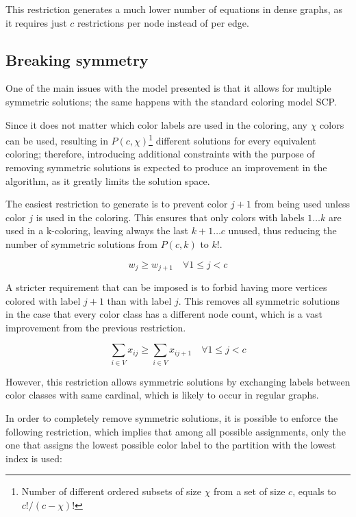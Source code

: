 This restriction generates a much lower number of equations in dense graphs, as it requires just $c$ restrictions per node instead of per edge.

\subsection{Breaking symmetry}
\label{subsec:model:symmetry}

One of the main issues with the model presented is that it allows for multiple symmetric solutions; the same happens with the standard coloring model SCP. 

Since it does not matter which color labels are used in the coloring, any $\chi$ colors can be used, resulting in $P(c,\chi)$\footnote{Number of different ordered subsets of size $\chi$ from a set of size $c$, equals to $c! / (c - \chi)!$} different solutions for every equivalent coloring; therefore, introducing additional constraints with the purpose of removing symmetric solutions is expected to produce an improvement in the algorithm, as it greatly limits the solution space.

The easiest restriction to generate is to prevent color $j+1$ from being used unless color $j$ is used in the coloring. This ensures that only colors with labels $1 \ldots k$ are used in a k-coloring, leaving always the last $k+1 \ldots c$ unused, thus reducing the number of symmetric solutions from $P(c,k)$ to $k!$.

\begin{equation}
\label{eqn:lowerlabel}
w_j \geq w_{j+1} \quad \forall 1 \leq j < c 
\end{equation}

A stricter requirement that can be imposed is to forbid having more vertices colored with label $j+1$ than with label $j$. This removes all symmetric solutions in the case that every color class has a different node count, which is a vast improvement from the previous restriction.

\begin{equation}
\label{eqn:symnodecount}
\sum_{i \in V} x_{ij} \geq \sum_{i \in V} x_{ij+1} \quad \forall 1 \leq j < c 
\end{equation}

However, this restriction allows symmetric solutions by exchanging labels between color classes with same cardinal, which is likely to occur in regular graphs. 

In order to completely remove symmetric solutions, it is possible to enforce the following restriction, which implies that among all possible assignments, only the one that assigns the lowest possible color label to the partition with the lowest index is used: 

